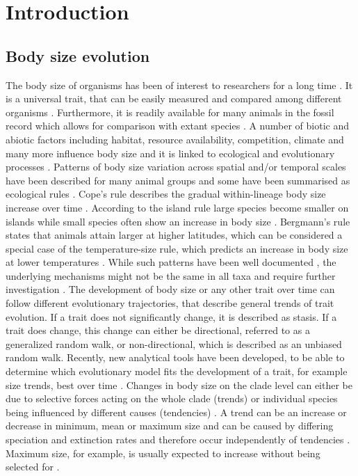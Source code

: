 \section{Introduction}
\subsection{Body size evolution}

The body size of organisms has been of interest to researchers for a long time \citep{Haldane1928,Peters1983}. It is a universal trait, that can be easily measured and compared among different organisms \citep{.}. Furthermore, it is readily available for many animals in the fossil record which allows for comparison with extant species \citep{.}. A number of biotic and abiotic factors including habitat, resource availability, competition, climate and many more influence body size and it is linked to ecological and evolutionary processes \citep{Blackburn1994a,Blueweiss1978,Smith2009}.
Patterns of body size variation across spatial and/or temporal scales have been described for many animal groups and some have been summarised as ecological rules \citep{Millien2006,Angielczyk2015}.
Cope's rule describes the gradual within-lineage body size increase over time \citep{Cope1887}. According to the island rule large species become smaller on islands while small species often show an increase in body size \citep{Foster1964}. Bergmann's rule \citep{Bergmann1848} states that animals attain larger at higher latitudes, which can be considered a special case of the temperature-size rule, which predicts an increase in body size at lower temperatures \citep{AngillettaJr2004a}.
While such patterns have been well documented
\citep{Millien2006}, the underlying mechanisms might not be the same in all taxa and require further investigation \citep{Smith2009}.
The development of body size or any other trait over time can follow different evolutionary trajectories, that describe general trends of trait evolution. If a trait does not significantly change, it is described as stasis. If a trait does change, this change can either be directional, referred to as a generalized random walk, or non-directional, which is described as an unbiased random walk. Recently, new analytical tools have been developed, to be able to determine which evolutionary model fits the development of a trait, for example size trends, best over time \citep{Hunt2006,Hunt2015}.
Changes in body size on the clade level can either be due to selective forces acting on the whole clade (trends) or individual species being influenced by different causes (tendencies) \citep{Hunt2006}. A trend can be an increase or decrease in minimum, mean or maximum size and can be caused by differing speciation and extinction rates and therefore occur independently of tendencies \citep{Smith2016}. Maximum size, for example, is usually expected to increase without being selected for \citep{Smith2016}.

